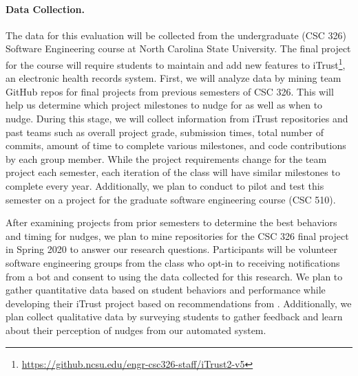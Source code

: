 \paragraph{Data Collection.} The data for this evaluation will be collected from the undergraduate (CSC 326) Software Engineering course at North Carolina State University. The final project for the course will require students to maintain and add new features to iTrust\footnote{\url{https://github.ncsu.edu/engr-csc326-staff/iTrust2-v5}}, an electronic health records system. First, we will analyze data by mining team GitHub repos for final projects from previous semesters of CSC 326. This will help us determine which project milestones to nudge for as well as when to nudge. During this stage, we will collect information from iTrust repositories and past teams such as overall project grade, submission times, total number of commits, amount of time to complete various milestones, and code contributions by each group member. While the project requirements change for the team project each semester, each iteration of the class will have similar milestones to complete every year. Additionally, we plan to conduct to pilot and test \TOOL this semester on a project for the graduate software engineering course (CSC 510).

After examining projects from prior semesters to determine the best behaviors and timing for nudges, we plan to mine repositories for the CSC 326 final project in Spring 2020 to answer our research questions. Participants will be volunteer software engineering groups from the class who opt-in to receiving notifications from a bot and consent to using the data collected for this research. We plan to gather quantitative data based on student behaviors and performance while developing their iTrust project based on recommendations from \TOOL. Additionally, we plan collect qualitative data by surveying students to gather feedback and learn about their perception of nudges from our automated system.

